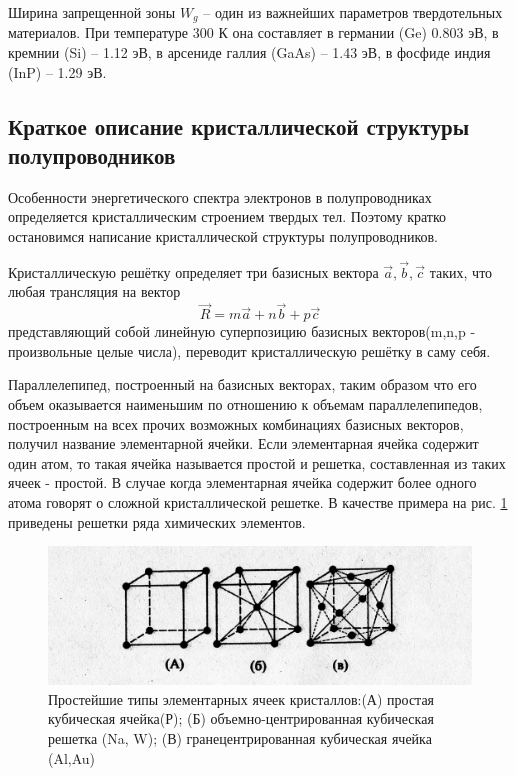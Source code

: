 Ширина запрещенной зоны $W_g$  – один из важнейших параметров твердотельных материалов.
При температуре 300 К она составляет в германии (Ge) 0.803 эВ, в кремнии (Si) – 1.12 эВ, в арсениде галлия (GaAs) – 1.43
эВ, в фосфиде индия (InP) – 1.29 эВ.

\subsection{Краткое описание кристаллической структуры полупроводников}
Особенности энергетического спектра электронов в полупроводниках определяется кристаллическим строением твердых тел.
Поэтому кратко остановимся написание кристаллической структуры полупроводников.

Кристаллическую решётку определяет три базисных вектора $\vec{a},\vec{b},\vec{c}$ таких, что любая трансляция на вектор
\begin{equation}
	\vec{R} = m \vec{a} + n \vec{b} + p \vec{c}
	\label{eq:1.1}
\end{equation}
представляющий собой линейную суперпозицию базисных векторов(m,n,p - произвольные целые числа), переводит
кристаллическую решётку в саму себя. 

Параллелепипед, построенный на базисных векторах, таким образом что его объем оказывается наименьшим по отношению к
объемам параллелепипедов, построенным на всех прочих возможных комбинациях базисных векторов, получил название
элементарной ячейки. Если элементарная ячейка содержит один атом, то такая ячейка называется простой и решетка,
составленная из таких ячеек - простой. В случае когда элементарная ячейка содержит более одного атома говорят о сложной
кристаллической решетке. В качестве примера на рис. \ref{fig:1.2} приведены решетки ряда химических элементов.

\begin{figure}[h!]
	\centering
	\includegraphics[width = .8\linewidth]{img/12.jpg}
	\caption{Простейшие типы элементарных ячеек кристаллов:(А) простая кубическая ячейка(Р); (Б) объемно-центрированная кубическая решетка (Na, W); (В) гранецентрированная кубическая ячейка (Al,Au)}
	\label{fig:1.2}
\end{figure}

